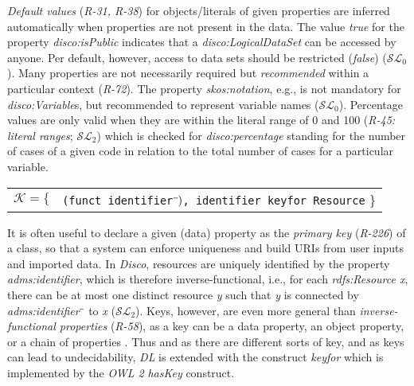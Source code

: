 \documentclass{llncs}
\newcommand{\ms}[1]{\texttt{#1}}
\newenvironment{DL}{
  \vspace{0cm}
	\begin{center}
  \begin{tabular}{c l}

}{
  \end{tabular}
	\end{center}
}
\begin{document}
{%
\emph{Default values} (\emph{R-31, R-38}) for objects/literals of given properties are inferred automatically when properties are not present in the data.
The value \emph{true} for the property {\em disco:isPublic} indicates that a {\em disco:LogicalDataSet} can be accessed by anyone.
Per default, however, access to data sets should be restricted (\emph{false}) ($\mathcal{SL}_{0}$).
Many properties are not necessarily required but \emph{recommended} within a particular context (\emph{R-72}).
The property {\em skos:notation}, e.g., is not mandatory for {\em disco:Variable}s, but recommended to represent variable names ($\mathcal{SL}_{0}$).
Percentage values are only valid when they are within the literal range of 0 and 100 (\emph{R-45: literal ranges}; $\mathcal{SL}_{2}$)
which is checked for \emph{disco:percentage} standing for the number of cases of a given code in relation to the total number of cases for a particular variable.

\begin{center}
\begin{DL} 
$\mathcal{K}=\{$ 
	&\ms{(funct identifier$\sp{\overline{\ }})$, identifier keyfor Resource}
 \}\\ 
\end{DL}
\end{center}

It is often useful to declare a given (data) property as the \emph{primary key} (\emph{R-226}) of a class, so that a system can enforce uniqueness and build URIs from user inputs and imported data. 
In \emph{Disco}, resources are uniquely identified by the property \emph{adms:identifier},
which is therefore inverse-functional,
i.e., for each \emph{rdfs:Resource x}, there can be at most one distinct resource \emph{y} such that \emph{y} is connected by \emph{adms:identifier$\sp{\overline{\ }}$} to \emph{x} ($\mathcal{SL}_{2}$).
Keys, however, are even more general than \emph{inverse-functional properties} (\emph{R-58}),
as a key can be a data property, an object property, or a chain of properties \cite{Schneider2009}.
Thus and as there are different sorts of key, and as keys can lead to undecidability, 
\emph{DL} is extended with the construct \emph{keyfor} \cite{Lutz2005} which is implemented by the \emph{OWL 2} \emph{hasKey} construct.

}
\end{document}
